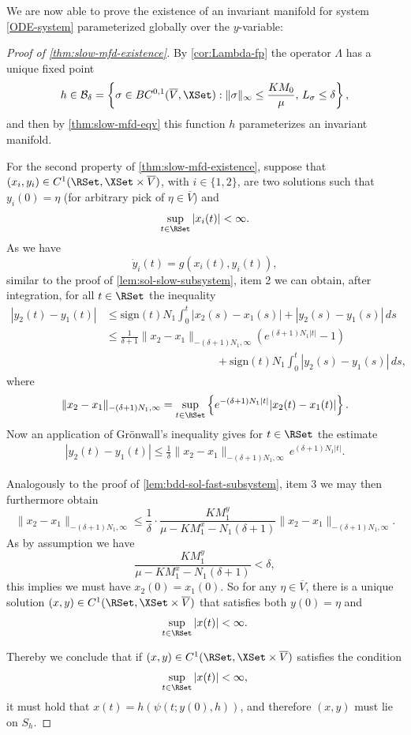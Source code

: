 \documentclass[a4paper]{siamart190516}
\newcommand{\sgn}{\text{sign}}
\begin{document}
 We are now able to prove the existence of an invariant manifold for system \cref{ODE-system} parameterized
 globally over the $y$-variable:
 
 \begin{proof}[Proof of \cref{thm:slow-mfd-existence}]
By \cref{cor:Lambda-fp} the operator $\Lambda$ has a unique fixed point 
\[
h \in \mathcal{B}_{\delta} = \left\{ \sigma \in BC^{0,1}(\overline{V},\XSet) : \|\sigma\|_{\infty} \leq \frac{K M_0}{\mu}, \, L_{\sigma} \leq  \delta \right\},
\] and then by \cref{thm:slow-mfd-eqv} this function $h$ parameterizes an invariant manifold. 

For the second property of \cref{thm:slow-mfd-existence}, suppose that
$(x_i,y_i) \in C^1(\RSet, \XSet \times \overline{V})$, with $i \in \{1,2 \}$, are two
solutions such that $y_i(0)=\eta$ (for arbitrary pick of $\eta \in \overline{V}$) and 
\[
\sup_{t \in \RSet} |x_i(t)| < \infty.
\]
As we have
\[
\dot{y}_i(t) = g(x_i(t), y_i(t)),
\]
similar to the proof of \cref{lem:sol-slow-subsystem}, item 2 we can obtain, after integration, for all $t \in \RSet$ the inequality 
\begin{align*}
|y_2(t)-y_1(t)| &\leq   \sgn(t) N_1  \int_0^t |x_2(s)- x_1(s)| + |y_2(s) - y_1(s)| \, ds \\
&\leq \frac{1}{\delta + 1} \|x_2 - x_1 \|_{-(\delta + 1)N_1, \infty} \left(e^{(\delta+1)N_1 |t|} - 1 \right) \\
&\qquad \qquad \qquad \qquad \qquad + \sgn(t) N_1 \int_0^t |y_2(s) - y_1(s)| \, ds,
\end{align*}
where
\[
\| x_2 - x_1 \|_{-(\delta + 1) N_1,\infty} = \sup_{t \in \RSet} \left\{ e^{-(\delta + 1) N_1|t|} |x_2(t) - x_1(t)|  \right\}.
\]
Now an application of Gr\"onwall's inequality gives for $t \in \RSet$ the estimate 
\begin{align*}
	|y_2(t) - y_1(t) | \leq \frac{1}{\delta} \| x_2 - x_1 \|_{-(\delta + 1) N_1,\infty} \, e^{(\delta+1)N_1|t|}.					
\end{align*}


Analogously to the proof of \cref{lem:bdd-sol-fast-subsystem}, item 3 we may then furthermore obtain
\[
\| x_2 - x_1 \|_{-(\delta + 1) N_1,\infty}  \leq \frac{1}{\delta} \cdot \frac{K M_1^y}{\mu-KM_1^x-N_1(\delta + 1)} \|x_2 - x_1 \|_{-(\delta + 1) N_1,\infty}.
\]
As by assumption we have 
\[
\frac{K M_1^y}{\mu - KM_1^x - N_1(\delta + 1)} < \delta,
\] 
this implies we must have $x_2(0) = x_1(0)$. So for any $\eta \in \overline{V}$, there is a unique solution $(x,y) \in C^1(\RSet, \XSet \times \overline{V})$ that satisfies both $y(0) = \eta$ and 
\[
\sup_{t \in \RSet} |x(t)| < \infty.
\]

Thereby we conclude that if $(x,y)  \in C^1(\RSet, \XSet \times \overline{V})$ satisfies the condition
\[
\sup_{t \in \RSet} |x(t)| < \infty,
\]
it must hold that $x(t) = h(\psi(t; y(0), h))$, and therefore $(x,y)$ must lie on $S_h$. 
 \end{proof}
\end{document}
